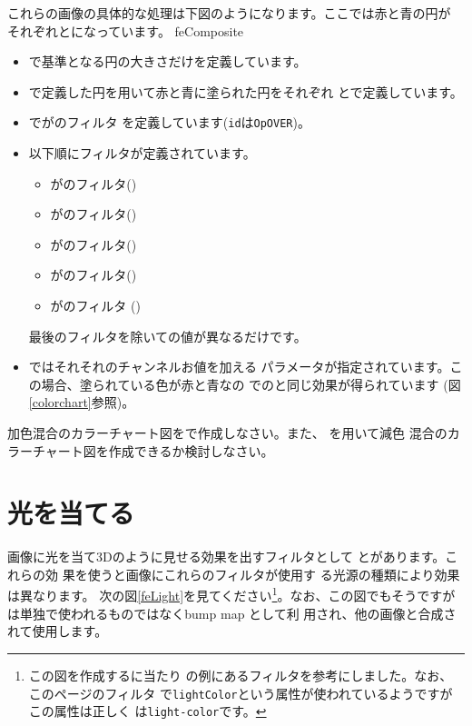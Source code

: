  これらの画像の具体的な処理は下図のようになります。ここでは赤と青の円が
 それぞれとになっています。
{feComposite}

\begin{itemize}
 \item {}で基準となる円の大きさだけを定義しています。
 \item {}で定義した円を用いて赤と青に塗られた円をそれぞれ
       とで定義しています。
 \item {}でがのフィルタ
       を定義しています(\texttt{id}は\texttt{OpOVER})。
 \item 以下順にフィルタが定義されています。
\begin{itemize}
 \item {}がのフィルタ()
 \item {}がのフィルタ()
 \item {}がのフィルタ()
 \item {}がのフィルタ()
 \item {}がのフィルタ
       ()
\end{itemize}
最後のフィルタを除いての値が異なるだけです。
 \item {}ではそれそれのチャンネルお値を加える
      パラメータが指定されています。この場合、塗られている色が赤と青なの
       でのと同じ効果が得られています
       (図\ref{colorchart}参照)。
\end{itemize}
\begin{Problem}
加色混合のカラーチャート図をで作成しなさい。また、
を用いて減色
 混合のカラーチャート図を作成できるか検討しなさい。
\end{Problem}
\iffalse
\section{光を当てる}
画像に光を当て3Dのように見せる効果を出すフィルタとして
とがあります。これらの効
果を使うと画像にこれらのフィルタが使用す
る光源の種類により効果は異なります。
次の図\ref{feLight}を見てください\footnote{この図を作成するに当たり
の例にあるフィルタを参考にしました。なお、このページのフィルタ
で\texttt{lightColor}という属性が使われているようですがこの属性は正しく
は\texttt{light-color}です。}。なお、この図でもそうですが
は単独で使われるものではなくbump map として利
用され、他の画像と合成されて使用します。
